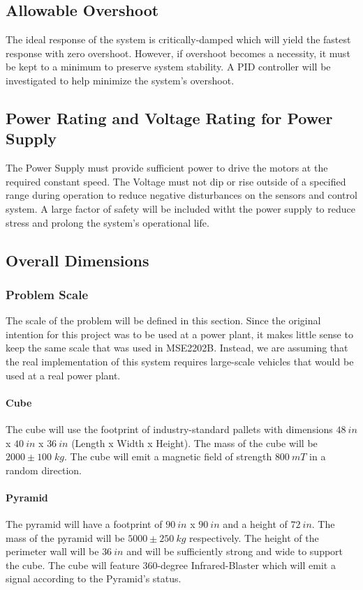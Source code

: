 \documentclass[12pt]{article}
\begin{document}
\subsection{Allowable Overshoot}
The ideal response of the system is critically-damped which will yield the fastest response with zero overshoot. However, if overshoot becomes a necessity, it must be kept to a minimum to preserve system stability. A PID controller will be investigated to help minimize the system's overshoot.
\subsection{Power Rating and Voltage Rating for Power Supply}
The Power Supply must provide sufficient power to drive the motors at the required constant speed. The Voltage must not dip or rise outside of a specified range during operation to reduce negative disturbances on the sensors and control system. A large factor of safety will be included witht the power supply to reduce stress and prolong the system's operational life.
\subsection{Overall Dimensions}

\subsubsection{Problem Scale}
The scale of the problem will be defined in this section. Since the original intention for this project was to be used at a power plant, it makes little sense to keep the same scale that was used in MSE2202B. Instead, we are assuming that the real implementation of this system requires large-scale vehicles that would be used at a real power plant. 

\paragraph{Cube} The cube will use the footprint of industry-standard pallets with dimensions $48 \: in$ x $40 \: in$ x $36 \: in$ (Length x Width x Height). The mass of the cube will be $2000 \pm 100 \; kg$. The cube will emit a magnetic field of strength $800 \: mT$ in a random direction.

\paragraph{Pyramid} The pyramid will have a footprint of $90 \: in$ x $90 \: in$ and a height of $72 \: in$. The mass of the pyramid will be $5000 \pm 250 \: kg$ respectively. The height of the perimeter wall will be $36 \: in$ and will be sufficiently strong and wide to support the cube. The cube will feature 360-degree Infrared-Blaster which will emit a signal according to the Pyramid's status.
\end{document}
